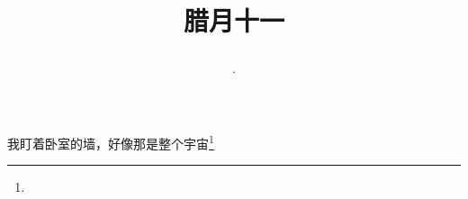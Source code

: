 \title{\date[d=21,m=1,y=2024][year:cn-y,年,month:cn,day:cn,日,·,weekday]·腊月十一 }
我盯着卧室的墙，好像那是整个宇宙\footnote{ }

